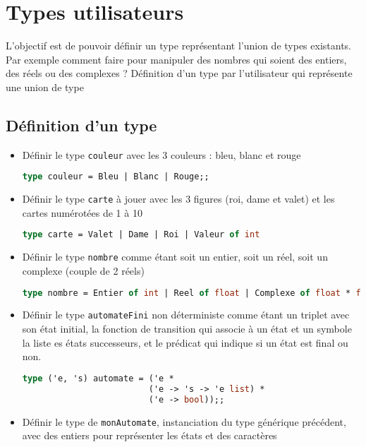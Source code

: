 \section{Types utilisateurs}
L'objectif est de pouvoir définir un type représentant l'union de types existants.
Par exemple comment faire pour manipuler des nombres qui
soient des entiers, des réels ou des complexes ? Définition d'un type par l'utilisateur qui représente une
union de type

\subsection{Définition d'un type}

\begin{exemple}
	\begin{itemize}
		\item Définir le type \texttt{couleur} avec les 3 couleurs : bleu, blanc et rouge
	\begin{lstlisting}[language=Caml, numbers=none, framerule=0pt]
type couleur = Bleu | Blanc | Rouge;;		
	\end{lstlisting}
\item Définir le type \texttt{carte} à jouer avec les 3 figures (roi, dame et valet) et les cartes numérotées de 1 à 10
	\begin{lstlisting}[language=Caml, numbers=none, framerule=0pt]
type carte = Valet | Dame | Roi | Valeur of int
	\end{lstlisting}
\item Définir le type \texttt{nombre} comme étant soit un entier, soit un réel, soit un complexe (couple de 2 réels)
	\begin{lstlisting}[language=Caml, numbers=none, framerule=0pt]
type nombre = Entier of int | Reel of float | Complexe of float * float;;	
	\end{lstlisting}
\item Définir le type \texttt{automateFini} non déterministe comme étant un triplet avec son état initial, la fonction de transition qui associe à un
	état et un symbole la liste es états successeurs, et le prédicat qui indique si un état est final ou non.
	\begin{lstlisting}[language=Caml, numbers=none, framerule=0pt]
type ('e, 's) automate = ('e * 
						 ('e -> 's -> 'e list) *
						 ('e -> bool));;
	\end{lstlisting}
\item Définir le type de \texttt{monAutomate}, instanciation du type générique précédent, avec des entiers pour représenter les états et des caractères

\end{itemize}
\end{exemple}
